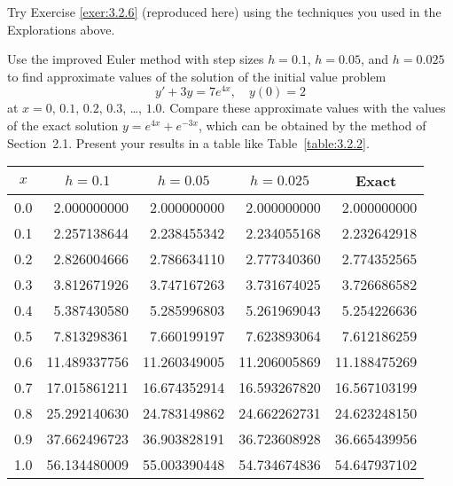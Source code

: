 \documentclass{ximera}
\begin{document}
\begin{problem}\label{exer:3.2.6L} 
Try Exercise \ref{exer:3.2.6} (reproduced here) using the techniques you used in the Explorations above.

\begin{problem}\label{exer:3.2.6} 
Use the improved Euler method with step sizes $h=0.1$, $h=0.05$, and $h=0.025$ to find approximate values of the solution of the initial value problem
$$
y'+3y=7e^{4x},\quad y(0)=2
$$
at $x=0$, $0.1$, $0.2$, $0.3$, \dots, $1.0$. Compare these approximate
values with the
values of the exact solution $y=e^{4x}+e^{-3x}$, which can be obtained
by the method of Section~2.1. Present your results in a table
like Table~\ref{table:3.2.2}.

\begin{solution}
    {\small
\begin{tabular}{|c|r|r|r|r|}\hline
\multicolumn{1}{|c|}{$x$}&
\multicolumn{1}{|c|}{$h=0.1$}&
\multicolumn{1}{|c|}{$h=0.05$}&
\multicolumn{1}{|c|}{$h=0.025$}&
\multicolumn{1}{|c|}{Exact}\\ \hline
0.0 &  2.000000000 &  2.000000000 &  2.000000000 &   2.000000000 \\
0.1 &  2.257138644 &  2.238455342 &  2.234055168 &   2.232642918 \\
0.2 &  2.826004666 &  2.786634110 &  2.777340360 &   2.774352565 \\
0.3 &  3.812671926 &  3.747167263 &  3.731674025 &   3.726686582 \\
0.4 &  5.387430580 &  5.285996803 &  5.261969043 &   5.254226636 \\
0.5 &  7.813298361 &  7.660199197 &  7.623893064 &   7.612186259 \\
0.6 & 11.489337756 & 11.260349005 & 11.206005869 &  11.188475269 \\
0.7 & 17.015861211 & 16.674352914 & 16.593267820 &  16.567103199 \\
0.8 & 25.292140630 & 24.783149862 & 24.662262731 &  24.623248150 \\
0.9 & 37.662496723 & 36.903828191 & 36.723608928 &  36.665439956 \\
1.0 & 56.134480009 & 55.003390448 & 54.734674836 &  54.647937102 \\
\hline
\end{tabular}}
\end{solution}
\end{problem}


\end{problem}
 

 
\end{document}
